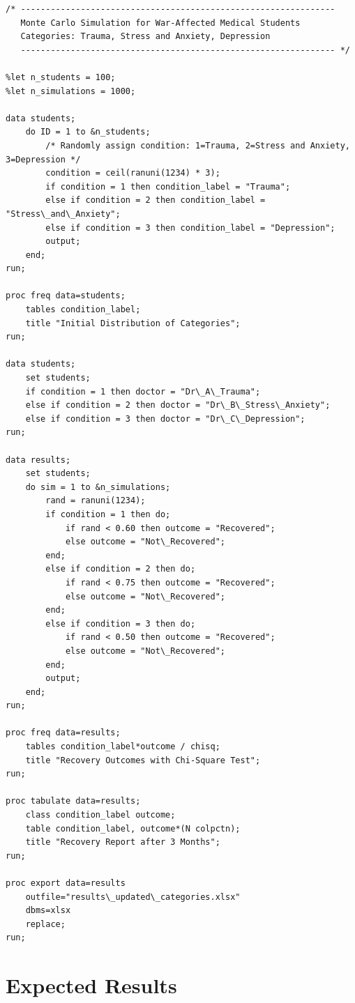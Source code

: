 \documentclass[12pt]{article}
\begin{document}
\begin{lstlisting}[style=sasstyle, caption={Monte Carlo Simulation in SAS with Trauma, Stress and Anxiety, Depression}]
/* ---------------------------------------------------------------
   Monte Carlo Simulation for War-Affected Medical Students
   Categories: Trauma, Stress and Anxiety, Depression
   --------------------------------------------------------------- */

%let n_students = 100;
%let n_simulations = 1000;

data students;
    do ID = 1 to &n_students;
        /* Randomly assign condition: 1=Trauma, 2=Stress and Anxiety, 3=Depression */
        condition = ceil(ranuni(1234) * 3);
        if condition = 1 then condition_label = "Trauma";
        else if condition = 2 then condition_label = "Stress\_and\_Anxiety";
        else if condition = 3 then condition_label = "Depression";
        output;
    end;
run;

proc freq data=students;
    tables condition_label;
    title "Initial Distribution of Categories";
run;

data students;
    set students;
    if condition = 1 then doctor = "Dr\_A\_Trauma";
    else if condition = 2 then doctor = "Dr\_B\_Stress\_Anxiety";
    else if condition = 3 then doctor = "Dr\_C\_Depression";
run;

data results;
    set students;
    do sim = 1 to &n_simulations;
        rand = ranuni(1234);
        if condition = 1 then do;
            if rand < 0.60 then outcome = "Recovered";
            else outcome = "Not\_Recovered";
        end;
        else if condition = 2 then do;
            if rand < 0.75 then outcome = "Recovered";
            else outcome = "Not\_Recovered";
        end;
        else if condition = 3 then do;
            if rand < 0.50 then outcome = "Recovered";
            else outcome = "Not\_Recovered";
        end;
        output;
    end;
run;

proc freq data=results;
    tables condition_label*outcome / chisq;
    title "Recovery Outcomes with Chi-Square Test";
run;

proc tabulate data=results;
    class condition_label outcome;
    table condition_label, outcome*(N colpctn);
    title "Recovery Report after 3 Months";
run;

proc export data=results
    outfile="results\_updated\_categories.xlsx"
    dbms=xlsx
    replace;
run;
\end{lstlisting}

\section*{Expected Results}
\end{document}
